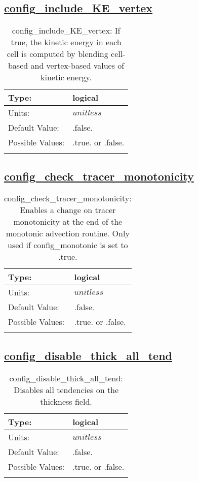 \subsection[config\_include\_KE\_vertex]{\hyperref[sec:nm_tab_debug]{config\_include\_KE\_vertex}}
\label{subsec:nm_sec_config_include_KE_vertex}
\begin{center}
\begin{longtable}{| p{2.0in} | p{4.0in} |}
    \hline
    Type: & logical \\
    \hline
    Units: & $unitless$ \\
    \hline
    Default Value: & .false. \\
    \hline
    Possible Values: & .true. or .false. \\
    \hline
    \caption{config\_include\_KE\_vertex: If true, the kinetic energy in each cell is computed by blending cell-based and vertex-based values of kinetic energy.}
\end{longtable}
\end{center}
\subsection[config\_check\_tracer\_monotonicity]{\hyperref[sec:nm_tab_debug]{config\_check\_tracer\_monotonicity}}
\label{subsec:nm_sec_config_check_tracer_monotonicity}
\begin{center}
\begin{longtable}{| p{2.0in} | p{4.0in} |}
    \hline
    Type: & logical \\
    \hline
    Units: & $unitless$ \\
    \hline
    Default Value: & .false. \\
    \hline
    Possible Values: & .true. or .false. \\
    \hline
    \caption{config\_check\_tracer\_monotonicity: Enables a change on tracer monotonicity at the end of the monotonic advection routine. Only used if config\_monotonic is set to .true.}
\end{longtable}
\end{center}
\subsection[config\_disable\_thick\_all\_tend]{\hyperref[sec:nm_tab_debug]{config\_disable\_thick\_all\_tend}}
\label{subsec:nm_sec_config_disable_thick_all_tend}
\begin{center}
\begin{longtable}{| p{2.0in} | p{4.0in} |}
    \hline
    Type: & logical \\
    \hline
    Units: & $unitless$ \\
    \hline
    Default Value: & .false. \\
    \hline
    Possible Values: & .true. or .false. \\
    \hline
    \caption{config\_disable\_thick\_all\_tend: Disables all tendencies on the thickness field.}
\end{longtable}
\end{center}
